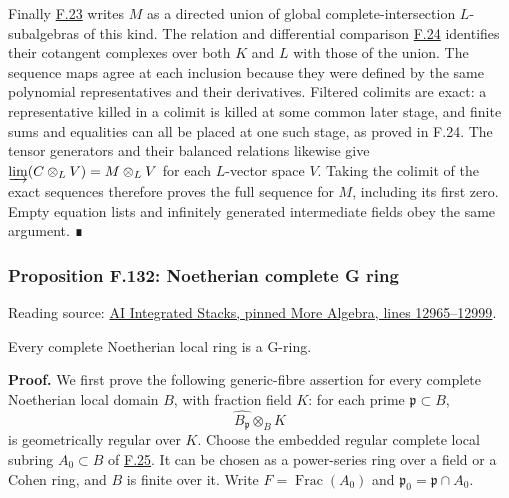 \documentclass[11pt,a4paper,openany]{report}
\begin{document}
Finally \hyperref[AG-RG-S05-algebra-lemma-colimit-syntomic]{F.23} writes \(M\) as a directed union of global complete-intersection \(L\)-subalgebras of this kind. The relation and differential comparison \hyperref[AG-RG-S05-algebra-lemma-colimits-NL]{F.24} identifies their cotangent complexes over both \(K\) and \(L\) with those of the union. The sequence maps agree at each inclusion because they were defined by the same polynomial representatives and their derivatives. Filtered colimits are exact: a representative killed in a colimit is killed at some common later stage, and finite sums and equalities can all be placed at one such stage, as proved in F.24. The tensor generators and their balanced relations likewise give \(\varinjlim(C\otimes_L V)=M\otimes_L V\) for each \(L\)-vector space \(V\). Taking the colimit of the exact sequences therefore proves the full sequence for \(M\), including its first zero. Empty equation lists and infinitely generated intermediate fields obey the same argument. ∎

\label{AG-RG-S05-more-algebra-proposition-Noetherian-complete-G-ring}

\subsubsection{Proposition F.132: Noetherian complete G ring}\label{AG-RG-S05-proposition-f.132-noetherian-complete-g-ring}

Reading source: \href{https://github.com/KokunoYumeto/unofficial-stacks-project-ai-drafts/blob/565b10e987aba5969b21145a0833f42d69f96790/more-algebra.tex\#L12965-L12999}{AI Integrated Stacks, pinned More Algebra, lines 12965--12999}.

Every complete Noetherian local ring is a G-ring.

\textbf{Proof.} We first prove the following generic-fibre assertion for every complete Noetherian local domain \(B\), with fraction field \(K\): for each prime \(\mathfrak p\subset B\), \[\widehat{B_{\mathfrak p}}\otimes_BK\] is geometrically regular over \(K\). Choose the embedded regular complete local subring \(A_0\subset B\) of \hyperref[AG-RG-S05-algebra-lemma-complete-local-Noetherian-domain-finite-over-regular]{F.25}. It can be chosen as a power-series ring over a field or a Cohen ring, and \(B\) is finite over it. Write \(F=\operatorname{Frac}(A_0)\) and \(\mathfrak p_0=\mathfrak p\cap A_0\).
\end{document}
